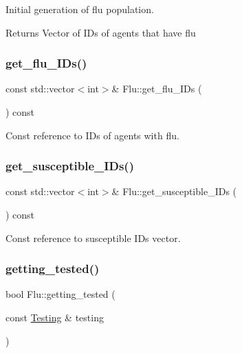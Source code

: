 Initial generation of flu population. 

\begin{DoxyReturn}{Returns}
Vector of I\+Ds of agents that have flu 
\end{DoxyReturn}
\mbox{\label{classFlu_a0e3acb295714b07d612580b7e7c8091c}} 
\subsubsection{\texorpdfstring{get\+\_\+flu\+\_\+\+I\+Ds()}{get\_flu\_IDs()}}
{\footnotesize\ttfamily const std\+::vector$<$int$>$\& Flu\+::get\+\_\+flu\+\_\+\+I\+Ds (\begin{DoxyParamCaption}{ }\end{DoxyParamCaption}) const\hspace{0.3cm}{\ttfamily [inline]}}



Const reference to I\+Ds of agents with flu. 

\mbox{\label{classFlu_ad635a41f158bb3941636059cf9eb911e}} 
\subsubsection{\texorpdfstring{get\+\_\+susceptible\+\_\+\+I\+Ds()}{get\_susceptible\_IDs()}}
{\footnotesize\ttfamily const std\+::vector$<$int$>$\& Flu\+::get\+\_\+susceptible\+\_\+\+I\+Ds (\begin{DoxyParamCaption}{ }\end{DoxyParamCaption}) const\hspace{0.3cm}{\ttfamily [inline]}}



Const reference to susceptible I\+Ds vector. 

\mbox{\label{classFlu_ab3eb12e70200001b11df26362206fbff}} 
\subsubsection{\texorpdfstring{getting\+\_\+tested()}{getting\_tested()}}
{\footnotesize\ttfamily bool Flu\+::getting\+\_\+tested (\begin{DoxyParamCaption}\item[{const \hyperlink{classTesting}{Testing} \&}]{testing }\end{DoxyParamCaption})\hspace{0.3cm}{\ttfamily [inline]}}



